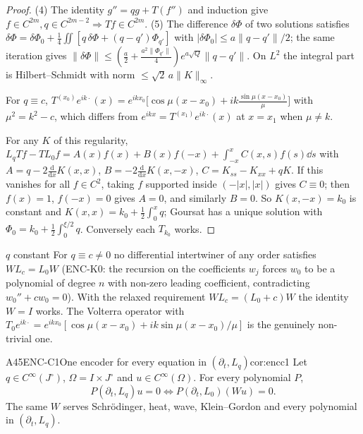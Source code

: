 \begin{proof}
(4) The identity $g''=qg+T(f'')$ and induction give $f\in C^{2m},q\in C^{2m-2}\Rightarrow Tf\in C^{2m}$. (5) The difference $\delta\Phi$ of two solutions satisfies $\delta\Phi=\delta\Phi_0+\frac14\iint[q\,\delta\Phi+(q-q')\Phi_{q'}]$ with $|\delta\Phi_0|\le a\|q-q'\|/2$; the same iteration gives $\|\delta\Phi\|\le(\frac a2+\frac{a^2\|\Phi_{q'}\|}4)e^{a\sqrt Q}\|q-q'\|$. On $L^2$ the integral part is Hilbert--Schmidt with norm $\le\sqrt2\,a\|K\|_\infty$.

For $q\equiv c$, $T^{(x_0)}e^{ik\cdot}(x)=e^{ikx_0}\big[\cos\mu(x-x_0)+ik\frac{\sin\mu(x-x_0)}\mu\big]$ with $\mu^2=k^2-c$, which differs from $e^{ikx}=T^{(x_1)}e^{ik\cdot}(x)$ at $x=x_1$ when $\mu\ne k$.

For any $K$ of this regularity, $L_qTf-TL_0f=A(x)f(x)+B(x)f(-x)+\int_{-x}^xC(x,s)f(s)\dd s$ with $A=q-2\frac{\mathrm d}{\mathrm dx}K(x,x)$, $B=-2\frac{\mathrm d}{\mathrm dx}K(x,-x)$, $C=K_{ss}-K_{xx}+qK$. If this vanishes for all $f\in C^2$, taking $f$ supported inside $(-|x|,|x|)$ gives $C\equiv0$; then $f(x)=1$, $f(-x)=0$ gives $A=0$, and similarly $B=0$. So $K(x,-x)=k_0$ is constant and $K(x,x)=k_0+\frac12\int_0^xq$; Goursat has a unique solution with $\Phi_0=k_0+\frac12\int_0^{\xi/2}q$. Conversely each $T_{k_0}$ works.

\end{proof}

\begin{example}{$q$ constant}
For $q\equiv c\ne0$ no differential intertwiner of any order satisfies $WL_c=L_0W$ (ENC-K0: the recursion on the coefficients $w_j$ forces $w_0$ to be a polynomial of degree $n$ with non-zero leading coefficient, contradicting $w_0''+cw_0=0$). With the relaxed requirement $WL_c=(L_0+c)W$ the identity $W=I$ works. The Volterra operator with $T_0e^{ik\cdot}=e^{ikx_0}[\cos\mu(x-x_0)+ik\sin\mu(x-x_0)/\mu]$ is the genuinely non-trivial one.
\end{example}

\begin{dimcard}{A45}{ENC-C1}{One encoder for every equation in $(\partial_t,L_q)$}{\proved}{cor:encc1}
Let $q\in C^\infty(J^\circ)$, $\Omega=I\times J^\circ$ and $u\in C^\infty(\Omega)$. For every polynomial $P$,
\[
P(\partial_t,L_q)u=0\iff P(\partial_t,L_0)(Wu)=0 .
\]
The same $W$ serves Schr\"odinger, heat, wave, Klein--Gordon and every polynomial in $(\partial_t,L_q)$.
\end{dimcard}


